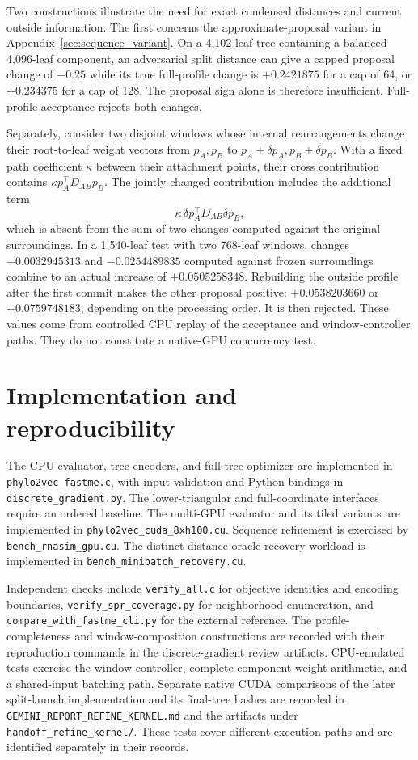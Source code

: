 Two constructions illustrate the need for exact condensed distances and current outside information.
The first concerns the approximate-proposal variant in Appendix~\ref{sec:sequence_variant}.
On a 4,102-leaf tree containing a balanced 4,096-leaf component, an adversarial split distance can give a capped proposal change of $-0.25$ while its true full-profile change is $+0.2421875$ for a cap of 64, or $+0.234375$ for a cap of 128.
The proposal sign alone is therefore insufficient.
Full-profile acceptance rejects both changes.

Separately, consider two disjoint windows whose internal rearrangements change their root-to-leaf weight vectors from $p_A,p_B$ to $p_A+\delta p_A,p_B+\delta p_B$.
With a fixed path coefficient $\kappa$ between their attachment points, their cross contribution contains
$\kappa p_A^\top D_{AB}p_B$.
The jointly changed contribution includes the additional term
\[
 \kappa\,\delta p_A^\top D_{AB}\delta p_B,
\]
which is absent from the sum of two changes computed against the original surroundings.
In a 1,540-leaf test with two 768-leaf windows, changes
$-0.0032945313$ and $-0.0254489835$ computed against frozen surroundings combine to an actual increase of $+0.0505258348$.
Rebuilding the outside profile after the first commit makes the other proposal positive:
$+0.0538203660$ or $+0.0759748183$, depending on the processing order.
It is then rejected.
These values come from controlled CPU replay of the acceptance and window-controller paths.
They do not constitute a native-GPU concurrency test.

\section{Implementation and reproducibility}
\label{sec:software}

The CPU evaluator, tree encoders, and full-tree optimizer are implemented in
\texttt{phylo2vec\_fastme.c}, with input validation and Python bindings in
\texttt{discrete\_gradient.py}.
The lower-triangular and full-coordinate interfaces require an ordered baseline.
The multi-GPU evaluator and its tiled variants are implemented in
\texttt{phylo2vec\_cuda\_8xh100.cu}.
Sequence refinement is exercised by \texttt{bench\_rnasim\_gpu.cu}.
The distinct distance-oracle recovery workload is implemented in
\texttt{bench\_minibatch\_recovery.cu}.

Independent checks include \texttt{verify\_all.c} for objective identities and encoding boundaries,
\texttt{verify\_spr\_coverage.py} for neighborhood enumeration, and
\texttt{compare\_with\_fastme\_cli.py} for the external reference.
The profile-completeness and window-composition constructions are recorded with their reproduction commands in the discrete-gradient review artifacts.
CPU-emulated tests exercise the window controller, complete component-weight arithmetic, and a shared-input batching path.
Separate native CUDA comparisons of the later split-launch implementation and its final-tree hashes are recorded in
\texttt{GEMINI\_REPORT\_REFINE\_KERNEL.md} and the artifacts under
\texttt{handoff\_refine\_kernel/}.
These tests cover different execution paths and are identified separately in their records.

